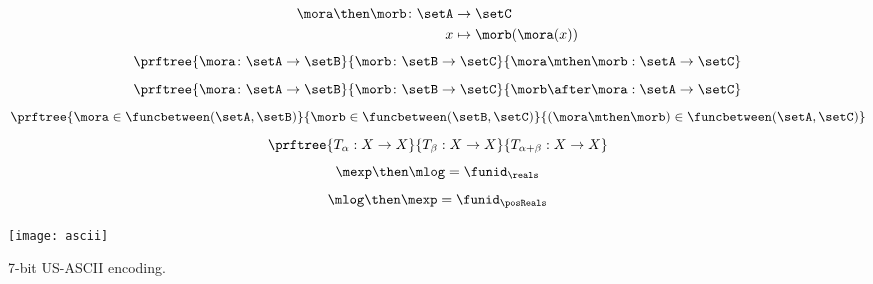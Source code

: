 {\begin{forslides}
\begin{equation}
            \label{eq:funcomposition}
            \begin{aligned}
                \mora \then \morb \colon \setA & \to  \setC \\
                x & \mapsto \morb(\mora(x))
            \end{aligned}
        \end{equation}
        \begin{equation}
            \label{eq:funccomp1}
            \prftree{\mora \colon \setA \to \setB}{\morb \colon \setB \to \setC}{\mora \mthen \morb : \setA \to \setC}
        \end{equation}
        \begin{equation}
            \label{eq:funccomp2}
            \prftree{\mora \colon \setA \to \setB}{\morb \colon \setB \to \setC}{\morb \after \mora : \setA \to \setC}
        \end{equation}
        \begin{equation}
            \label{eq:funccomp3}
            \prftree{%
                \mora \in \funcbetween(\setA, \setB)}{%
                \morb \in \funcbetween( \setB, \setC)}{
                (\mora \mthen \morb) \in \funcbetween( \setA, \setC)}
        \end{equation}
        \begin{equation}
            \label{eq:transitions}
            \prftree{T_\alpha: X \to X }{T_\beta : X \to X}{T_{\alpha+\beta} : X \to X}
        \end{equation}
        \begin{equation}
            \label{eq:explogid}
            \mexp \then \mlog = \funid_{\reals}
        \end{equation}
        \begin{equation}
            \label{eq:logexpid}
            \mlog \then \mexp = \funid_{\posReals}
        \end{equation}
    \end{forslides}
}%

\begin{marginfigure}
    \texttt{[image: ascii]}
    \caption{7-bit US-ASCII encoding. \label{fig:asciifigure}}
\end{marginfigure}


